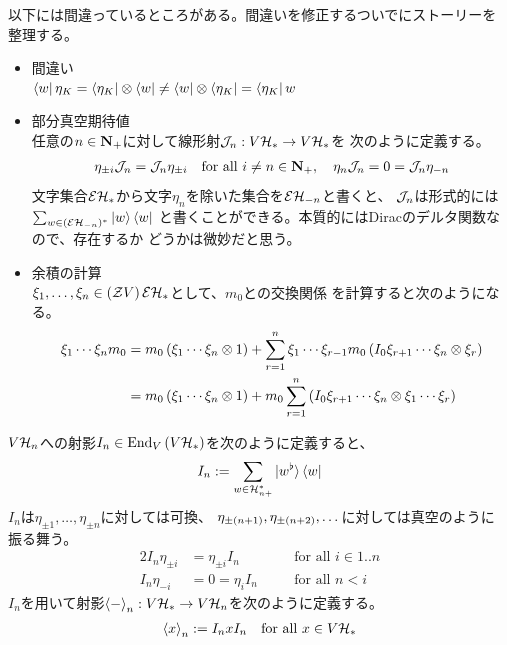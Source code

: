 {	\begin{todo}[リファクタリング]\label{todo:リファクタリング} %
		以下には間違っているところがある。間違いを修正するついでにストーリーを
		整理する。
		\begin{itemize}\setlength{\itemsep}{-1mm} %
			\item 間違い \\
			$\mathinner{\langle{w}|}\eta_K=\mathinner{\langle{\eta_K}|}\otimes\mathinner{\langle{w}|}
			\neq\mathinner{\langle{w}|}\otimes\mathinner{\langle{\eta_K}|}=\mathinner{\langle{\eta_K}|}w$
			\item 部分真空期待値 \\
			任意の$n\in\mathbf{N}_+$に対して線形射${{\mathcal{J}}}_n:V{{\mathcal{H}}}_*\to V{{\mathcal{H}}}_*$を
			次のように定義する。
			\begin{equation*}\begin{split}
				\eta_{\pm i}{{\mathcal{J}}}_n = {{\mathcal{J}}}_n\eta_{\pm i}
				\quad\text{for all } i\neq n\in\mathbf{N}_+,\quad
				\eta_n{{\mathcal{J}}}_n = 0 = {{\mathcal{J}}}_n\eta_{-n}
			\end{split}\end{equation*}
			文字集合${{\mathcal{E}}}{{\mathcal{H}}}_*$から文字$\eta_n$を除いた集合を${{\mathcal{E}}}{{\mathcal{H}}}_{-n}$と書くと、
			${{\mathcal{J}}}_n$は形式的には$\sum_{w\in({{\mathcal{E}}}{{\mathcal{H}}}_{-n})^*}\mathinner{|{w}\rangle}\mathinner{\langle{w}|}$
			と書くことができる。本質的にはDiracのデルタ関数なので、存在するか
			どうかは微妙だと思う。
			\item 余積の計算 \\
			$\xi_1,\dots,\xi_n\in\mathinner{\left({{\ensuremath{{\mathcal{Z}}}}V}\right)}{\ensuremath{{\mathcal{E}}}}{\ensuremath{{\mathcal{H}}}}_*$として、$m_0$との交換関係
			を計算すると次のようになる。
			\begin{equation*}\begin{split}
				\xi_1\cdots\xi_n m_0 &= m_0\mathinner{\left({\xi_1\cdots\xi_n \otimes1}\right)}
					+ \sum_{r=1}^n \xi_1\cdots\xi_{r-1} m_0
					\mathinner{\left({I_0\xi_{r+1}\cdots\xi_n\otimes\xi_r}\right)} \\
				&= m_0\mathinner{\left({\xi_1\cdots\xi_n \otimes1}\right)} + m_0 \sum_{r=1}^n 
					\mathinner{\left({I_0\xi_{r+1}\cdots\xi_n\otimes\xi_1\cdots\xi_r}\right)} \\
			\end{split}\end{equation*}
		\end{itemize} %
	\end{todo} %

	$V{{\mathcal{H}}}_n$への射影$I_n\in{\ensuremath{\operatorname{End}}}_V\mathinner{\left({V{\ensuremath{{\mathcal{H}}}}_*}\right)}$を次のように定義すると、
	\begin{equation*}\begin{split}
		I_n := \sum_{w\in{\ensuremath{{\mathcal{H}}}}_{n+}^*}\mathinner{|{w^\flat}\rangle}\mathinner{\langle{w}|}
	\end{split}\end{equation*}
	$I_n$は$\eta_{\pm1},\dots,\eta_{\pm n}$に対しては可換、
	$\eta_{\pm\mathinner{\left({n+1}\right)}},\eta_{\pm\mathinner{\left({n+2}\right)}},\dots$に対しては真空のように
	振る舞う。
	\begin{alignat*}{2}
		I_n\eta_{\pm i} &= \eta_{\pm i}I_n &\quad&\text{for all } i\in1..n \\
		I_n\eta_{-i} &= 0 = \eta_iI_n &\quad&\text{for all } n < i
	\end{alignat*}
	$I_n$を用いて射影$\mathinner{\langle{-}\rangle}_n:V{{\mathcal{H}}}_*\to V{{\mathcal{H}}}_n$を次のように定義する。
	\begin{equation*}\begin{split}
		\mathinner{\langle{x}\rangle}_n := I_nxI_n \quad\text{for all } x\in V{{\mathcal{H}}}_*
	\end{split}\end{equation*}

}
